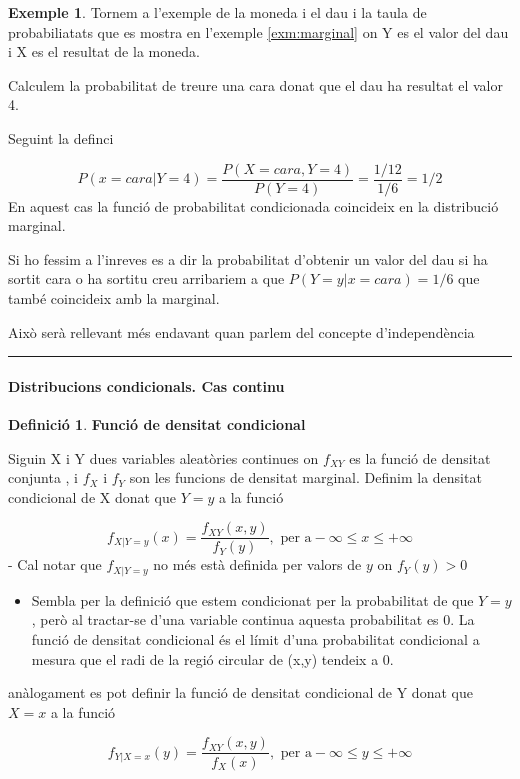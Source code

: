 \documentclass[
  catalan,
]{article}
\providecommand{\tightlist}{%
  \setlength{\itemsep}{0pt}\setlength{\parskip}{0pt}}
\theoremstyle{definition}
\newtheorem{definition}{Definició}[section]
\theoremstyle{definition}
\newtheorem{example}{Exemple}[section]
\theoremstyle{definition}
\theoremstyle{definition}
\theoremstyle{remark}
\begin{document}
\begin{example}
Tornem a l'exemple de la moneda i el dau i la taula de probabiliatats que es mostra en l'exemple \ref{exm:marginal} on Y es el valor del dau i X es el resultat de la moneda.

Calculem la probabilitat de treure una cara donat que el dau ha resultat el valor 4.

Seguint la definci

\[
P(x=cara | Y=4)= \frac { P(X=cara , Y=4)}{ P(Y=4)}= \frac {1/12} {1/6}=1/2
\]
En aquest cas la funció de probabilitat condicionada coincideix en la distribució marginal.

Si ho fessim a l'inreves es a dir la probabilitat d'obtenir un valor del dau si ha sortit cara o ha sortitu creu arribariem a que \(P(Y=y|x=cara)=1/6\) que també coincideix amb la marginal.

Això serà rellevant més endavant quan parlem del concepte d'independència
\end{example}

\begin{center}\rule{0.5\linewidth}{0.5pt}\end{center}

\paragraph{Distribucions condicionals. Cas continu}\label{distribucions-condicionals.-cas-continu}

\begin{definition}
\textbf{Funció de densitat condicional}

Siguin X i Y dues variables aleatòries continues on \(f_{XY}\) es la funció de densitat conjunta , i \(f_X\) i \(f_Y\) son les funcions de densitat marginal. Definim la densitat condicional de X donat que \(Y=y\) a la funció

\[
f_{X|Y=y}(x)= \frac {f_{XY}(x,y)}{f_Y(y)}, \text{ per a} - \infty \leq x \leq + \infty
\]
- Cal notar que \(f_{X|Y=y}\) no més està definida per valors de \(y\) on \(f_Y(y)>0\)

\begin{itemize}
\tightlist
\item
  Sembla per la definició que estem condicionat per la probabilitat de que \(Y=y\), però al tractar-se d'una variable continua aquesta probabilitat es 0. La funció de densitat condicional és el límit d'una probabilitat condicional a mesura que el radi de la regió circular de (x,y) tendeix a 0.
\end{itemize}

anàlogament es pot definir la funció de densitat condicional de Y donat que \(X=x\) a la funció

\[
f_{Y|X=x}(y)= \frac {f_{XY}(x,y)}{f_X(x)}, \text{ per a} - \infty \leq y \leq + \infty
\]
\end{definition}
\end{document}
